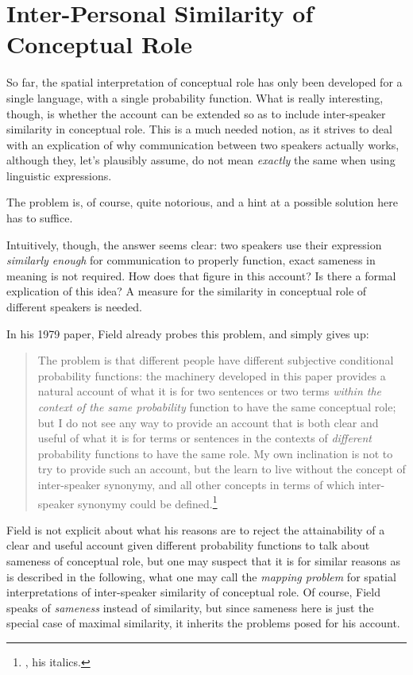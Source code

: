 \documentclass[11pt, a4paper]{scrartcl}
\renewcommand{\i}[1]{\emph{#1}}
\begin{document}
\section{Inter-Personal Similarity of Conceptual Role}

So far, the spatial interpretation of conceptual role has only been developed for a single language, with a single probability function. What is really interesting, though, is whether the account can be extended so as to include inter-speaker similarity in conceptual role. This is a much needed notion, as it strives to deal with an explication of why communication between two speakers actually works, although they, let's plausibly assume, do not mean \i{exactly} the same when using linguistic expressions. 

The problem is, of course, quite notorious, and a hint at a possible solution here has to suffice.

Intuitively, though, the answer seems clear: two speakers use their expression \i{similarly enough} for communication to properly function, exact sameness in meaning is not required. How does that figure in this account? Is there a formal explication of this idea? A measure for the similarity in conceptual role of different speakers is needed. 

In his 1979 paper, Field already probes this problem, and simply gives up:

{\singlespacing{} 
\begin{quote}
  The problem is that different people have different subjective
 conditional probability functions: the machinery developed in this
 paper provides a natural account of what it is for two sentences or
 two terms \i{within the context of the same probability} function to have
 the same conceptual role; but I do not see any way to provide an
 account that is both clear and useful of what it is for terms or sentences in the contexts of \i{different} probability functions to have the
 same role. My own inclination is not to try to provide such an
 account, but the learn to live without the concept of inter-speaker
 synonymy, and all other concepts in terms of which inter-speaker
 synonymy could be defined.\footnote{\textcite[398]{Field1977}, his italics.} 
 \end{quote}
}

 Field is not explicit about what his reasons are to reject the attainability of a clear and useful account given different probability functions to talk about sameness of conceptual role, but one may suspect that it is for similar reasons as is described in the following, what one may call the \i{mapping problem} for spatial interpretations of inter-speaker similarity of conceptual role. Of course, Field speaks of \i{sameness} instead of similarity, but since sameness here is just the special case of maximal similarity, it inherits the problems posed for his account.  
\end{document}
